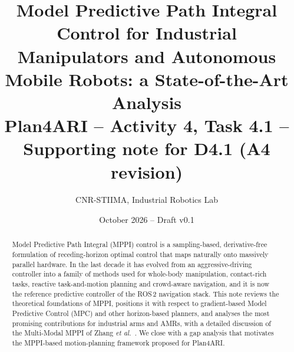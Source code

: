 \documentclass[10pt,a4paper]{article}
\title{\textbf{Model Predictive Path Integral Control for Industrial Manipulators and Autonomous Mobile Robots: a State-of-the-Art Analysis}\\[4pt]
\large Plan4ARI -- Activity 4, Task 4.1 -- Supporting note for D4.1 (A4 revision)}
\author{CNR-STIIMA, Industrial Robotics Lab}
\date{October 2026 -- Draft v0.1}
\begin{document}
\maketitle

\begin{abstract}
\noindent
Model Predictive Path Integral (MPPI) control is a sampling-based, derivative-free formulation of receding-horizon optimal control that maps naturally onto massively parallel hardware. In the last decade it has evolved from an aggressive-driving controller into a family of methods used for whole-body manipulation, contact-rich tasks, reactive task-and-motion planning and crowd-aware navigation, and it is now the reference predictive controller of the ROS\,2 navigation stack. This note reviews the theoretical foundations of MPPI, positions it with respect to gradient-based Model Predictive Control (MPC) and other horizon-based planners, and analyses the most promising contributions for industrial arms and AMRs, with a detailed discussion of the Multi-Modal MPPI of Zhang \emph{et al.}~\cite{zhang2024m3p2i}. We close with a gap analysis that motivates the MPPI-based motion-planning framework proposed for Plan4ARI.
\end{abstract}





\end{document}
